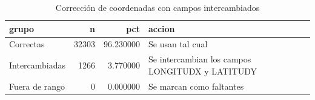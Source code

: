 \begin{table}[htbp]
\caption{Corrección de coordenadas con campos intercambiados}
\label{tab:tabla_31_correccion_coordenadas}
\begin{tabular}{lrrl}
\toprule
grupo & n & pct & accion \\
\midrule
Correctas & 32303 & 96.230000 & Se usan tal cual \\
Intercambiadas & 1266 & 3.770000 & Se intercambian los campos LONGITUDX y LATITUDY \\
Fuera de rango & 0 & 0.000000 & Se marcan como faltantes \\
\bottomrule
\end{tabular}
\end{table}
